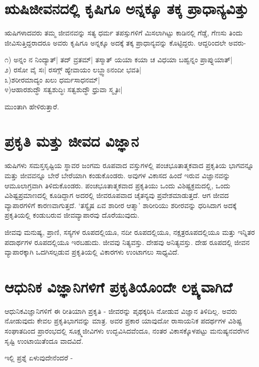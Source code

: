 \section*{ಋಷಿಜೀವನದಲ್ಲಿ ಕೃಷಿಗೂ ಅನ್ನಕ್ಕೂ ತಕ್ಕ ಪ್ರಾಧಾನ್ಯವಿತ್ತು}

ಋಷಿಗಳಾದವರು ತಮ್ಮ ಜೀವನವನ್ನು ಸತ್ಯ ಧರ್ಮ ತಪಸ್ಸುಗಳಿಗೆ ಮಿಸಲಾಗಿಟ್ಟು ಕಾಡಿನಲ್ಲಿ ಗೆಡ್ಡೆ, ಗೆಣಸು ತಿಂದು ಜೀವಿಸುತ್ತಿದ್ದರಾದರೂ ಅವರು ಕೃಷಿಗೂ ಅನ್ನಕ್ಕೂ ಅದಕ್ಕೆ ತಕ್ಕ ಪ್ರಾಧಾನ್ಯವನ್ನು ಕೊಟ್ಟಿದ್ದರು. ಆದ್ದರಿಂದಲೇ ಅವರು-

೧) ಅನ್ನಂ ನ ನಿಂದ್ಯಾತ್| ತದ್ ವ್ರತಮ್| ತಸ್ಮಾತ್ ಯಯಾ ಕಯಾ ಚ ವಿಧಯಾ ಬಹ್ವನ್ನಂ ಪ್ರಾಪ್ನುಯಾತ್|\\
೨) ರಸೋ ವೈ ಸಃ| ರಸಗ್ಗ್ ಹ್ಯೇವಾಯಂ ಲಬ್ಧ್ವಾಽನಂದೀ ಭವತಿ|\\
೩)ಶರೀರಮಾದ್ಯಂ ಖಲು ಧರ್ಮಸಾಧನಮ್|\\
೪)ಆಹಾರಶುದ್ಧೌ ಸತ್ವಶುದ್ಧಿಃ ಸತ್ವಶುದ್ಧೌ ಧ್ರುವಾ ಸ್ಮೃತಿಃ|

ಮುಂತಾಗಿ ಹೇಳಿರುತ್ತಾರೆ.

\section*{ಪ್ರಕೃತಿ ಮತ್ತು ಜೀವದ ವಿಜ್ಞಾನ}

ಋಷಿಗಳು ಸಮಸ್ತಸೃಷ್ಟಿಯ ಸ್ಥಾವರ ಜಂಗಮ ರೂಪವಾದ ವಸ್ತುಗಳಲ್ಲಿ ಪಂಚಭೂತಾತ್ಮಕವಾದ ಪ್ರಕೃತಿಯ ಭಾಗವನ್ನೂ ಮತ್ತು ಜೀವವನ್ನೂ ಬೇರೆ ಬೇರೆಯಾಗಿ ಕಂಡುಕೊಂಡರು. ಅವುಗಳ ವಿಕಾಸದ ಹಿಂದೆ ಇರುವ ವಿಜ್ಞಾನವನ್ನು ಆಮೂಲಾಗ್ರವಾಗಿ ತಿಳಿದುಕೊಂಡರು. ಪಂಚಭೂತಾತ್ಮಕವಾದ ಪ್ರಕೃತಿಯು ಒಂದು ವಿಶಿಷ್ಟಕ್ರಮದಲ್ಲಿ, ಒಂದು ವಿಶಿಷ್ಟಪ್ರಮಾಣದಲ್ಲಿ ಕೂಡಿದ್ದಾಗ ಅದರಲ್ಲಿ ಜೀವರೂಪವಾದ ಚೈತನ್ಯವು ಪ್ರವೇಶಮಾಡುತ್ತದೆ. ಆಗ ಜೀವದ ವ್ಯಾಪಾರಗಳಿಗೆ ಕಾರಣವಾಗುತ್ತದೆ. `ತಸ್ಯೈಷ ಏವ ಶಾರೀರ ಆತ್ಮಾ' ಶಾರೀರಿಯು ಶರೀರವನ್ನು ಧರಿಸಿದಾಗ ಅದಕ್ಕೆ  ಪ್ರಕೃತಿಯಲ್ಲಿ ಕಂಡುಬರುವ ಜೀವವ್ಯಾಪಾರವು ದೊರೆಯುವುದು.

ಜೀವವು ಮನುಷ್ಯ, ಪ್ರಾಣಿ, ಸಸ್ಯಗಳ ರೂಪದಲ್ಲಿಯೂ, ನದೀ ರೂಪದಲ್ಲಿಯೂ, ನಕ್ಷತ್ರರೂಪದಲ್ಲಿಯೂ ಮತ್ತು ಇನ್ನಿತರ ಪದಾರ್ಥಗಳ ರೂಪದಲ್ಲಿಯೂ ಇರಬಹುದು. ಜೀವವು ನಿತ್ಯವಸ್ತು. ದೇಹವು ಅನಿತ್ಯವಸ್ತು. ದೇಹ ರೂಪದಲ್ಲಿ ಜೀವನ ವ್ಯಾಪಾರಕ್ಕಾಗಿ ಒದಗಿಸಲ್ಪಡುವ ಪ್ರಕೃತಿಯಲ್ಲಿ ವಿಕಾರಗಳು ಉಂಟಾಗಲು ಸಾಧ್ಯವಿದೆ.

\section*{ಆಧುನಿಕ ವಿಜ್ಞಾನಿಗಳಿಗೆ ಪ್ರಕೃತಿಯೊಂದೇ ಲಕ್ಷ್ಯವಾಗಿದೆ}

ಆಧುನಿಕವಿಜ್ಞಾನಿಗಳಿಗೆ ಈ ರೀತಿಯಾಗಿ ಪ್ರಕೃತಿ - ಜೀವರನ್ನು ಪೃಥಕ್ಕರಿಸಿ ನೋಡುವ ವಿಜ್ಞಾನ ತಿಳಿದಿಲ್ಲ. ಅವರು ನೋಡುವುದು ಕೇವಲ ಪ್ರಕೃತಿಭಾಗವನ್ನು ಮಾತ್ರ. ಅವರ ಪ್ರಕಾರ ಯಾವುದೋ ರಾಸಾಯನಿಕ ಪದರ್ಥಗಳ ವಿಶಿಷ್ಟ ಸಂಘಾತದಿಂದ ಪ್ರಾರಂಭದಲ್ಲಿ ಸೂಕ್ಷ್ಮಜೀವಿಗಳು ಉದ್ಭವಿಸಿದವೆಂದೂ, ನಂತರ ವಿಕಾಸಕ್ಕೊಳಪಟ್ಟು ಮನುಷ್ಯನವರೆಗಿನ ಸೃಷ್ಟಿ ಉಂಟಾಯಿತೆಂದೂ ವಾದವಿದೆ.

ಇಲ್ಲಿ ಪ್ರಶ್ನೆ ಏಳುವುದೇನೆಂದರೆ -

